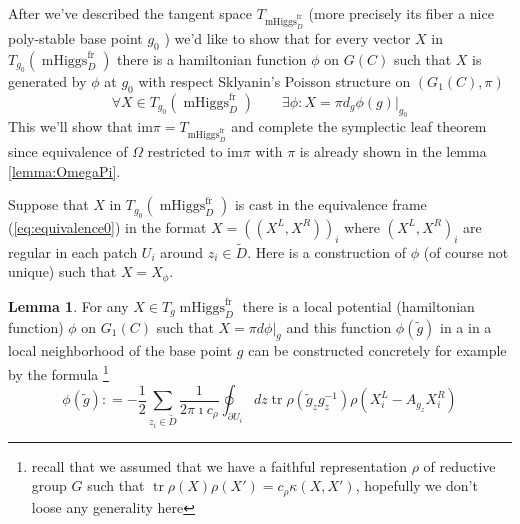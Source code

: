 \documentclass[11pt, oneside, reqno]{amsart}
\theoremstyle{definition} \newtheorem{definition}{Definition}[section]
\newtheorem{lemma}[definition]{Lemma}
\theoremstyle{definition} \newtheorem{remark}[definition]{Remark}
\theoremstyle{definition} \newtheorem{remarks}[definition]{Remarks}
\theoremstyle{definition} \newtheorem{question}[definition]{Question}
\theoremstyle{definition} \newtheorem*{note}{Note}
\theoremstyle{definition} \newtheorem{example}[definition]{Example}
\theoremstyle{definition} \newtheorem{examples}[definition]{Examples}
\DeclareMathOperator{\tr}{tr}
\DeclareMathOperator{\mhiggs}{mHiggs}
\newcommand{\fr}{\mathrm{fr}}
\begin{document}
After we've described the tangent space  $T_{\mhiggs_{D}^{\fr}}$ (more precisely its fiber
a nice poly-stable base point $g_0$ )   we'd like to show that
for every vector $X$ in $T_{g_0}(\mhiggs_{D}^{\fr})$ there is a 
hamiltonian function $\phi$ on $G(C)$ such that $X$ is generated by $\phi$ at $g_0$ with respect Sklyanin's Poisson structure on $(G_1(C), \pi)$
\begin{equation}
  \forall X \in  T_{g_0}( \mhiggs_{D}^{\fr}) \qquad \exists \phi: X  = \pi d_{g}\phi(g) |_{g_0}
\end{equation}
This we'll show that $\mathrm{im} \pi = T_{\mhiggs_{D}^{\fr}}$
and complete the symplectic leaf theorem since equivalence of $\Omega$ restricted to
$\mathrm{im} \pi $ with $\pi$ is already shown in the lemma \ref{lemma:OmegaPi}.


Suppose that $X$ in $T_{g_0}( \mhiggs_{D}^{\fr}) $ is cast in the equivalence frame (\ref{eq:equivalence0}) in the format $X = ((X^{L}, X^{R}))_{i}$ where $(X^{L}, X^{R})_{i}$ are regular
in each patch $U_i$ around $z_i \in \tilde D$. Here is a construction of $\phi$ (of course not unique) such that $X = X_{\phi}$.


\begin{lemma}\label{xtophi}
  For any $X \in T_{g} \mhiggs^{\fr}_{D}$ there is a local potential (hamiltonian function)
  $\phi$ on $G_1(C)$ such that $X = \pi d \phi|_{g} $ and this function $\phi(\tilde g)$
  in a in a local neighborhood of the base point $g$
  can be constructed 
  concretely for example by the formula \footnote{recall
  that we assumed that we have a faithful representation $\rho$
  of reductive group  $G$ such that $\tr\rho(X) \rho(X') = c_\rho \kappa(X, X')$, hopefully
we don't loose any generality here}
\begin{equation}
  \phi(\tilde g) : = -\frac 1 2 \sum_{z_i \in \tilde D} \frac{1}{2 \pi \imath c_\rho} \oint_{\partial U_{i}} 
dz  \tr \rho( \tilde g_z  g_z^{-1}) \rho(X^{L}_i - A_{ g_z} X_{i}^{R}) 
\end{equation}
\end{lemma}
  
\end{document}
